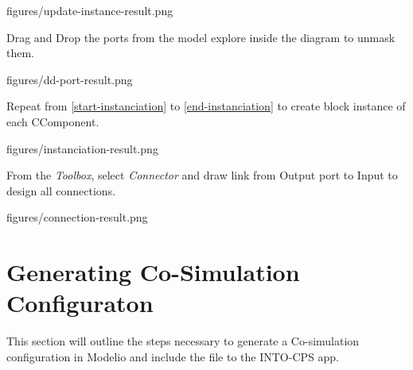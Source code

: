 \documentclass[11pt,a4paper]{../tutorial}
\begin{document}
\begin{instructions}
\begin{center}
\begin{annotation}[width=0.7\linewidth]{figures/update-instance-result.png}
    \end{annotation}
\end{center}

\item \label{end-instanciation}Drag and Drop the ports from the model explore inside the diagram to unmask them.

\begin{center}
\begin{annotation}[width=0.7\linewidth]{figures/dd-port-result.png}
    \end{annotation}
\end{center}

\item Repeat from \ref{start-instanciation}  to \ref{end-instanciation} to create block instance of each CComponent.

\begin{center}
\begin{annotation}[width=0.7\linewidth]{figures/instanciation-result.png}
    \end{annotation}
\end{center}

\item From the \emph{Toolbox}, select \emph{Connector} and draw link from Output port to Input to design all connections.

\begin{center}
\begin{annotation}[width=0.7\linewidth]{figures/connection-result.png}
    \end{annotation}
\end{center}

\end{instructions}

\section{Generating Co-Simulation Configuraton}

This section will outline the steps necessary to generate a Co-simulation configuration in Modelio and include the file to the INTO-CPS app.
\end{document}

